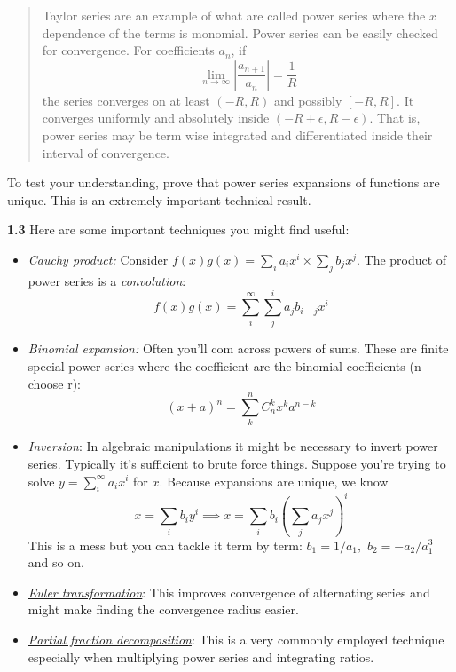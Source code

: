 \documentclass[11pt]{article}
\begin{document}
\begin{quote}
Taylor series are an example of what are called power series where the
\(x\) dependence of the terms is monomial. Power series can be easily
checked for convergence. For coefficients \(a_n\), if \[
\lim_{n\to \infty}\left|\frac{a_{n+1}}{a_n} \right| = \frac{1}{R}
\] the series converges on at least \((-R, R)\) and possibly
\([-R, R]\). It converges uniformly and absolutely inside
\((-R+\epsilon, R-\epsilon)\). That is, power series may be term wise
integrated and differentiated inside their interval of convergence.
\end{quote}

To test your understanding, prove that power series expansions of
functions are unique. This is an extremely important technical result.

\textbf{1.3} Here are some important techniques you might find useful:

\begin{itemize}
\item
  \emph{Cauchy product:} Consider
  \(f(x)g(x)=\sum_i a_i x^i\times \sum_jb_j x^j\). The product of power
  series is a \emph{convolution}: \[
   f(x)g(x)= \sum_{i}^\infty\sum_j^i a_j b_{i-j}x^i
  \]
\item
  \emph{Binomial expansion:} Often you'll com across powers of sums.
  These are finite special power series where the coefficient are the
  binomial coefficients (n choose r): \[
  (x+a)^n = \sum_k^n C_{n}^k x^k a^{n-k}
  \]
\item
  \emph{Inversion}: In algebraic manipulations it might be necessary to
  invert power series. Typically it's sufficient to brute force things.
  Suppose you're trying to solve \(y = \sum_i^\infty a_i x^i\) for
  \(x\). Because expansions are unique, we know \[
  x=\sum_i b_i y^i\implies x = \sum_{i}b_i \left(\sum_j a_j x^j\right)^i
  \] This is a mess but you can tackle it term by term: \(b_1=1/a_1,\)
  \(b_2=-a_2/a_1^3\) and so on.
\item
  \emph{\href{https://mathworld.wolfram.com/EulersSeriesTransformation.html}{Euler
  transformation}}: This improves convergence of alternating series and
  might make finding the convergence radius easier.
\item
  \emph{\href{https://en.wikipedia.org/wiki/Partial_fraction_decomposition}{Partial
  fraction decomposition}}: This is a very commonly employed technique
  especially when multiplying power series and integrating ratios.
\end{itemize}
\end{document}
